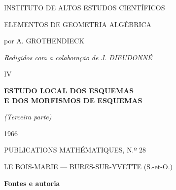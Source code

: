 \begin{titlepage}
\thispagestyle{empty}
\begin{center}
{\Large INSTITUTO DE ALTOS ESTUDOS CIENTÍFICOS\par}
\vspace{4.5em}
{\LARGE ELEMENTOS DE GEOMETRIA ALGÉBRICA\par}
\vspace{1.5em}
{\large por A. GROTHENDIECK\par}
\vspace{0.5em}
{\large\itshape Redigidos com a colaboração de J. DIEUDONNÉ\par}
\vspace{3em}
{\Large IV\par}
\vspace{1.25em}
{\Large\bfseries ESTUDO LOCAL DOS ESQUEMAS\\
E DOS MORFISMOS DE ESQUEMAS\par}
\vspace{0.75em}
{\large\itshape (Terceira parte)\par}
\vfill
{\Large 1966\par}
\vspace{1.5em}
{\Large PUBLICATIONS MATHÉMATIQUES, N.º 28\par}
\vspace{0.75em}
{\large LE BOIS-MARIE --- BURES-SUR-YVETTE (S.-et-O.)\par}
\end{center}
\end{titlepage}

\clearpage
\thispagestyle{empty}
\vspace*{0.27\textheight}
\begin{center}
\end{center}

\vfill
\clearpage
\begingroup\small
\noindent\textbf{Fontes e autoria}

